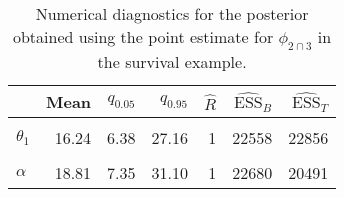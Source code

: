 \begin{table}

\caption{Numerical diagnostics for the posterior obtained using the point estimate for $\phi_{2 \cap 3}$ in the survival example.}
\centering
\begin{tabular}[t]{lrrrrrr}
\toprule
  & Mean & $q_{0.05}$ & $q_{0.95}$ & $\widehat{R}$ & $\widehat{\text{ESS}}_{B}$ & $\widehat{\text{ESS}}_{T}$\\
\midrule
\cellcolor{gray!6}{$\theta_{0}$} & \cellcolor{gray!6}{6.56} & \cellcolor{gray!6}{1.92} & \cellcolor{gray!6}{11.55} & \cellcolor{gray!6}{1} & \cellcolor{gray!6}{21369} & \cellcolor{gray!6}{20831}\\
$\theta_{1}$ & 16.24 & 6.38 & 27.16 & 1 & 22558 & 22856\\
\cellcolor{gray!6}{$\gamma$} & \cellcolor{gray!6}{10.11} & \cellcolor{gray!6}{7.25} & \cellcolor{gray!6}{13.43} & \cellcolor{gray!6}{1} & \cellcolor{gray!6}{15998} & \cellcolor{gray!6}{20376}\\
$\alpha$ & 18.81 & 7.35 & 31.10 & 1 & 22680 & 20491\\
\bottomrule
\end{tabular}
\end{table}